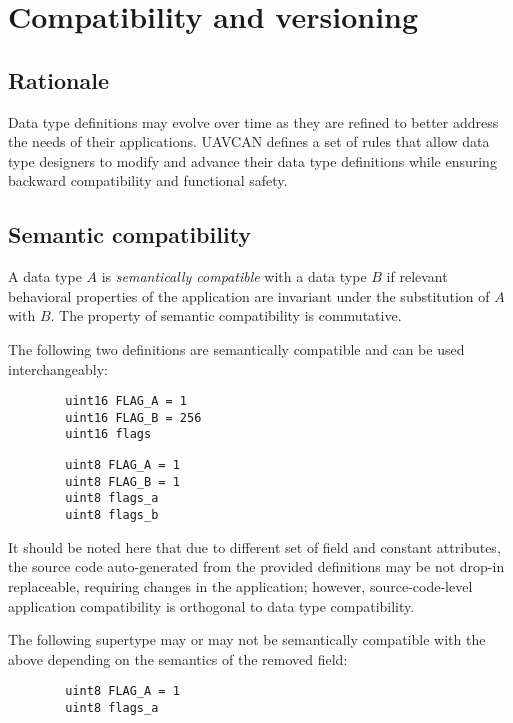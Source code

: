 \section{Compatibility and versioning}\label{sec:dsdl_versioning}

\subsection{Rationale}

Data type definitions may evolve over time as they are refined to better address the needs of their applications.
UAVCAN defines a set of rules that allow data type designers to modify and advance their
data type definitions while ensuring backward compatibility and functional safety.

\subsection{Semantic compatibility}\label{sec:dsdl_semantic_compatibility}

A data type $A$ is \emph{semantically compatible} with a data type $B$
if relevant behavioral properties of the application are invariant under the substitution of $A$ with $B$.
The property of semantic compatibility is commutative.

\begin{remark}[breakable]
    The following two definitions are semantically compatible and can be used interchangeably:

    \begin{verbatim}
        uint16 FLAG_A = 1
        uint16 FLAG_B = 256
        uint16 flags
    \end{verbatim}

    \begin{verbatim}
        uint8 FLAG_A = 1
        uint8 FLAG_B = 1
        uint8 flags_a
        uint8 flags_b
    \end{verbatim}

    It should be noted here that due to different set of field and constant attributes,
    the source code auto-generated from the provided definitions may be not drop-in replaceable,
    requiring changes in the application;
    however, source-code-level application compatibility is orthogonal to data type compatibility.

    The following supertype may or may not be semantically compatible with the above
    depending on the semantics of the removed field:

    \begin{verbatim}
        uint8 FLAG_A = 1
        uint8 flags_a
    \end{verbatim}
\end{remark}

